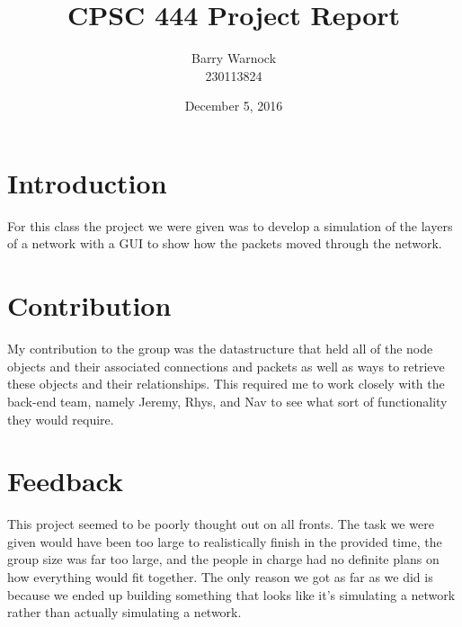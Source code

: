 \documentclass{article}
\begin{document}
\title{CPSC 444 Project Report}
\author{Barry Warnock\\
  230113824}
\date{December 5, 2016}
\maketitle


\section*{Introduction}
For this class the project we were given was to develop a simulation of the layers of a network with a GUI to show how the packets moved through
the network.

\section*{Contribution}
My contribution to the group was the datastructure that held all of the node objects and their associated connections and packets as well as ways
to retrieve these objects and their relationships. This required me to work closely with the back-end team, namely Jeremy, Rhys, and Nav to see
what sort of functionality they would require.

\section*{Feedback}
This project seemed to be poorly thought out on all fronts. The task we were given would have been too large to realistically finish in the
provided time, the group size was far too large, and the people in charge had no definite plans on how everything would fit together. The only reason
we got as far as we did is because we ended up building something that looks like it's simulating a network rather than actually simulating a
network.
\end{document}
